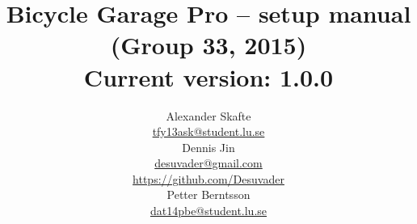 \title{
	Bicycle Garage Pro -- setup manual\\
	(Group 33, 2015)\\
	\vspace{0.2in}
	\normalsize Current version: 1.0.0
}
\author{
	Alexander Skafte\\
	\url{tfy13ask@student.lu.se}\\
	Dennis Jin\\
	\url{desuvader@gmail.com}\\
	\url{https://github.com/Desuvader}\\
	Petter Berntsson\\
	\url{dat14pbe@student.lu.se}
}
\date{}

